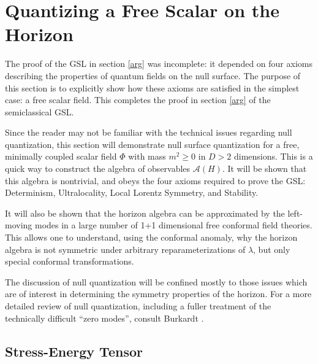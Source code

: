 \documentclass{article}
\begin{document}
\section{Quantizing a Free Scalar on the Horizon}\label{scalar}

The proof of the GSL in section \ref{arg} was incomplete: it depended on four axioms describing the properties of quantum fields on the null surface.  The purpose of this section is to explicitly show how these axioms are satisfied in the simplest case: a free scalar field.  This completes the proof in section \ref{arg} of the semiclassical GSL.

Since the reader may not be familiar with the technical issues regarding null quantization, this section will demonstrate null surface quantization for a free, minimally coupled scalar field $\Phi$ with mass $m^2 \ge 0$ in $D > 2$ dimensions.  This is a quick way to construct the algebra of observables $\mathcal{A}(H)$.  It will be shown that this algebra is nontrivial, and obeys the four axioms required to prove the GSL: Determinism, Ultralocality, Local Lorentz Symmetry, and Stability.

It will also be shown that the horizon algebra can be approximated by the left-moving modes in a large number of 1+1 dimensional free conformal field theories.  This allows one to understand, using the conformal anomaly, why the horizon algebra is not symmetric under arbitrary reparameterizations of $\lambda$, but only special conformal transformations.

The discussion of null quantization will be confined mostly to those issues which are of interest in determining the symmetry properties of the horizon.  For a more detailed review of null quantization, including a fuller treatment of the technically difficult ``zero modes'', consult Burkardt \cite{burkardt96}.

\subsection{Stress-Energy Tensor}
\end{document}
